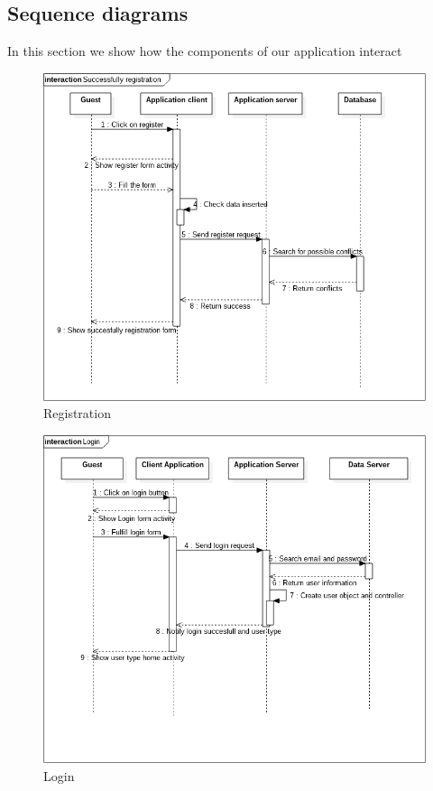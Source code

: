 	\subsection{Sequence diagrams}
In this section we show how the components of our application interact
\begin{figure} [h]
\centering
\includegraphics[scale=0.5]{Sequence Diagrams/successfully_registration.png}
\caption{ Registration }
\end{figure}
\newpage
\begin{figure} [h]
\centering
\includegraphics[scale=0.5]{Sequence Diagrams/login.png}
\caption{Login }
\end{figure}
